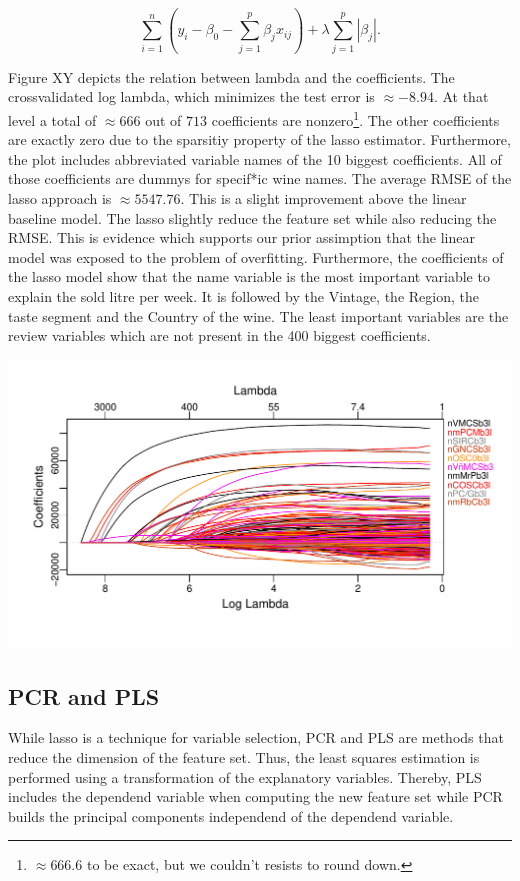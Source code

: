 \documentclass[11pt,]{article}
\let\rmarkdownfootnote\footnote%
\def\footnote{\protect\rmarkdownfootnote}
\begin{document}
\[
\sum_{i=1}^{n}(y_i - \beta_0 - \sum_{j=1}^{p}\beta_jx_{ij})+\lambda\sum_{j=1}^{p}|\beta_j|.
\]

Figure XY depicts the relation between lambda and the coefficients. The
crossvalidated log lambda, which minimizes the test error is
\(\approx -8.94\). At that level a total of \(\approx 666\) out of
\(713\) coefficients are
nonzero\footnote{$\approx 666.6$ to be exact, but we couldn't resists to round down.}.
The other coefficients are exactly zero due to the sparsitiy property of
the lasso estimator. Furthermore, the plot includes abbreviated variable
names of the 10 biggest coefficients. All of those coefficients are
dummys for specif*ic wine names. The average RMSE of the lasso approach
is \(\approx 5547.76\). This is a slight improvement above the linear
baseline model. The lasso slightly reduce the feature set while also
reducing the RMSE. This is evidence which supports our prior assimption
that the linear model was exposed to the problem of overfitting.
Furthermore, the coefficients of the lasso model show that the name
variable is the most important variable to explain the sold litre per
week. It is followed by the Vintage, the Region, the taste segment and
the Country of the wine. The least important variables are the review
variables which are not present in the 400 biggest coefficients.

\includegraphics{../00_data/output_paper/06_lasso_vars.pdf}

\hypertarget{pcr-and-pls}{%
\subsection{PCR and PLS}\label{pcr-and-pls}}

While lasso is a technique for variable selection, PCR and PLS are
methods that reduce the dimension of the feature set. Thus, the least
squares estimation is performed using a transformation of the
explanatory variables. Thereby, PLS includes the dependend variable when
computing the new feature set while PCR builds the principal components
independend of the dependend variable.
\end{document}
